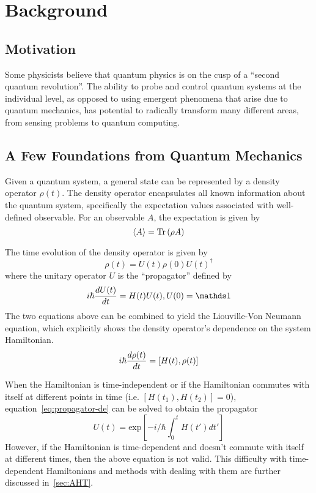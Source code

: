 \chapter{Background}

\section{Motivation}

Some physicists believe that quantum physics is on the cusp of a ``second quantum revolution''\cite{quantum-rev}. The ability to probe and control quantum systems at the individual level, as opposed to using emergent phenomena that arise due to quantum mechanics, has potential to radically transform many different areas, from sensing problems to quantum computing.


\section{A Few Foundations from Quantum Mechanics}

Given a quantum system, a general state can be represented by a density operator $\rho(t)$. The density operator encapsulates all known information about the quantum system, specifically the expectation values associated with well-defined observable. For an observable $A$, the expectation is given by
\[
\langle A \rangle = \text{Tr}\left( \rho A \right)
\]

The time evolution of the density operator is given by
\begin{equation}\label{eq:density-time}
    \rho(t) = U(t) \rho(0) U(t)^\dagger
\end{equation}
where the unitary operator $U$ is the ``propagator'' defined by
\begin{equation}\label{eq:propagator-de}
    i\hbar \ddt{U(t)} = H(t) U(t), U(0) = \identity
\end{equation}
The two equations above can be combined to yield the Liouville-Von Neumann equation, which explicitly shows the density operator's dependence on the system Hamiltonian.
\begin{equation}
    i\hbar \frac{d \rho(t)}{dt} = [H(t), \rho(t)]
\end{equation}

When the Hamiltonian is time-independent or if the Hamiltonian commutes with itself at different points in time (i.e. $[H(t_1), H(t_2)] = 0$), equation~\ref{eq:propagator-de} can be solved to obtain the propagator
\[
U(t) = \text{exp}\left[ {-i/\hbar \int_0^t H(t') dt'} \right]
\]
However, if the Hamiltonian is time-dependent and doesn't commute with itself at different times, then the above equation is not valid. This difficulty with time-dependent Hamiltonians and methods with dealing with them are further discussed in~\ref{sec:AHT}.

